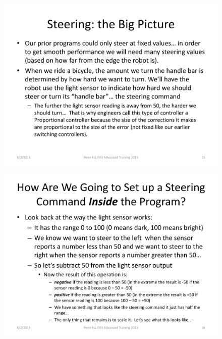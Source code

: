 \documentclass[11pt]{beamer}
\begin{document}
\begin{frame}
\begin{figure}
\includegraphics[scale=0.4]{ev3advanced2015/file-page15}
\end{figure}
\end{frame}


\begin{frame}
\begin{figure}
\includegraphics[scale=0.4]{ev3advanced2015/file-page16}
\end{figure}
\end{frame}
\end{document}
